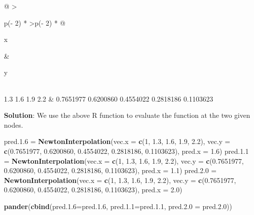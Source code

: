 \documentclass[
]{book}
\newenvironment{Shaded}{\begin{snugshade}}{\end{snugshade}}
\newcommand{\AttributeTok}[1]{\textcolor[rgb]{0.13,0.29,0.53}{#1}}
\newcommand{\DecValTok}[1]{\textcolor[rgb]{0.00,0.00,0.81}{#1}}
\newcommand{\FloatTok}[1]{\textcolor[rgb]{0.00,0.00,0.81}{#1}}
\newcommand{\FunctionTok}[1]{\textcolor[rgb]{0.13,0.29,0.53}{\textbf{#1}}}
\newcommand{\NormalTok}[1]{#1}
\newcommand{\OtherTok}[1]{\textcolor[rgb]{0.56,0.35,0.01}{#1}}
\begin{document}
\begin{longtable}[]{@{}
  >{\raggedright\arraybackslash}p{(\columnwidth - 2\tabcolsep) * }
  >{\centering\arraybackslash}p{(\columnwidth - 2\tabcolsep) * }@{}}
\toprule\noalign{}
\begin{minipage}[b]{\linewidth}\raggedright
x
\end{minipage} & \begin{minipage}[b]{\linewidth}\centering
y
\end{minipage} \\
\midrule\noalign{}
\endhead
\bottomrule\noalign{}
1.3
1.6
1.9
2.2 & 0.7651977
0.6200860
0.4554022
0.2818186
0.1103623 \\
\end{longtable}

\textbf{Solution}: We use the above R function to evaluate the function at the two given nodes.

\begin{Shaded}
\begin{Highlighting}[]
\NormalTok{pred.}\FloatTok{1.6} \OtherTok{=} \FunctionTok{NewtonInterpolation}\NormalTok{(}\AttributeTok{vec.x =} \FunctionTok{c}\NormalTok{(}\DecValTok{1}\NormalTok{, }\FloatTok{1.3}\NormalTok{, }\FloatTok{1.6}\NormalTok{, }\FloatTok{1.9}\NormalTok{, }\FloatTok{2.2}\NormalTok{),           }
                    \AttributeTok{vec.y =} \FunctionTok{c}\NormalTok{(}\FloatTok{0.7651977}\NormalTok{, }\FloatTok{0.6200860}\NormalTok{, }\FloatTok{0.4554022}\NormalTok{, }\FloatTok{0.2818186}\NormalTok{, }\FloatTok{0.1103623}\NormalTok{), }
                    \AttributeTok{pred.x =} \FloatTok{1.6}\NormalTok{)}
\NormalTok{pred.}\FloatTok{1.1} \OtherTok{=} \FunctionTok{NewtonInterpolation}\NormalTok{(}\AttributeTok{vec.x =} \FunctionTok{c}\NormalTok{(}\DecValTok{1}\NormalTok{, }\FloatTok{1.3}\NormalTok{, }\FloatTok{1.6}\NormalTok{, }\FloatTok{1.9}\NormalTok{, }\FloatTok{2.2}\NormalTok{),           }
                    \AttributeTok{vec.y =} \FunctionTok{c}\NormalTok{(}\FloatTok{0.7651977}\NormalTok{, }\FloatTok{0.6200860}\NormalTok{, }\FloatTok{0.4554022}\NormalTok{, }\FloatTok{0.2818186}\NormalTok{, }\FloatTok{0.1103623}\NormalTok{), }
                    \AttributeTok{pred.x =} \FloatTok{1.1}\NormalTok{)}
\NormalTok{pred.}\FloatTok{2.0} \OtherTok{=} \FunctionTok{NewtonInterpolation}\NormalTok{(}\AttributeTok{vec.x =} \FunctionTok{c}\NormalTok{(}\DecValTok{1}\NormalTok{, }\FloatTok{1.3}\NormalTok{, }\FloatTok{1.6}\NormalTok{, }\FloatTok{1.9}\NormalTok{, }\FloatTok{2.2}\NormalTok{),           }
                    \AttributeTok{vec.y =} \FunctionTok{c}\NormalTok{(}\FloatTok{0.7651977}\NormalTok{, }\FloatTok{0.6200860}\NormalTok{, }\FloatTok{0.4554022}\NormalTok{, }\FloatTok{0.2818186}\NormalTok{, }\FloatTok{0.1103623}\NormalTok{), }
                    \AttributeTok{pred.x =} \FloatTok{2.0}\NormalTok{)}

\FunctionTok{pander}\NormalTok{(}\FunctionTok{cbind}\NormalTok{(}\AttributeTok{pred.1.6=}\NormalTok{pred.}\FloatTok{1.6}\NormalTok{, }\AttributeTok{pred.1.1=}\NormalTok{pred.}\FloatTok{1.1}\NormalTok{, }\AttributeTok{pred.2.0 =}\NormalTok{ pred.}\FloatTok{2.0}\NormalTok{))}
\end{Highlighting}
\end{Shaded}
\end{document}
